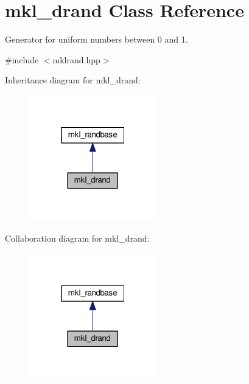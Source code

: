 \hypertarget{classmkl__drand}{}\section{mkl\+\_\+drand Class Reference}
\label{classmkl__drand}


Generator for uniform numbers between 0 and 1.  




{\ttfamily \#include $<$mklrand.\+hpp$>$}



Inheritance diagram for mkl\+\_\+drand\+:
\nopagebreak
\begin{figure}[H]
\begin{center}
\leavevmode
\includegraphics[width=157pt]{d1/df0/classmkl__drand__inherit__graph}
\end{center}
\end{figure}


Collaboration diagram for mkl\+\_\+drand\+:
\nopagebreak
\begin{figure}[H]
\begin{center}
\leavevmode
\includegraphics[width=157pt]{da/d86/classmkl__drand__coll__graph}
\end{center}
\end{figure}
